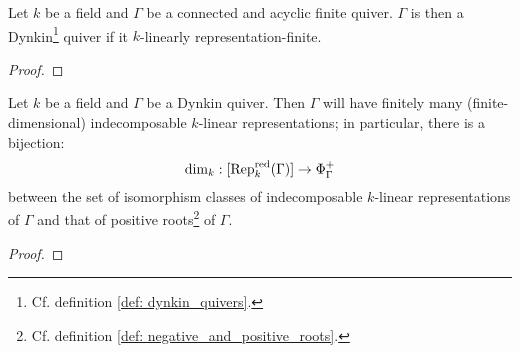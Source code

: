             \begin{theorem} \label{theorem: geometric_gabriel_theorem_representation_finite_implies_dynkin}
                Let $k$ be a field and $\Gamma$ be a connected and acyclic finite quiver. $\Gamma$ is then a Dynkin\footnote{Cf. definition \ref{def: dynkin_quivers}.} quiver if it $k$-linearly representation-finite.
            \end{theorem}
                \begin{proof}
                    
                \end{proof}
        
            \begin{theorem} \label{theorem: geometric_gabriel_theorem_dynkin_implies_representation_finite}
                Let $k$ be a field and $\Gamma$ be a Dynkin quiver. Then $\Gamma$ will have finitely many (finite-dimensional) indecomposable $k$-linear representations; in particular, there is a bijection:
                    $$\dim_k: [\mathrm{Rep}_k^{\mathrm{red}}(\Gamma)] \to \Phi_{\Gamma}^+$$
                between the set of isomorphism classes of indecomposable $k$-linear representations of $\Gamma$ and that of positive roots\footnote{Cf. definition \ref{def: negative_and_positive_roots}.} of $\Gamma$.
            \end{theorem}
                \begin{proof}
                    
                \end{proof}
                
            \begin{example}
                
            \end{example}
            \begin{example}
                
            \end{example}
            \begin{example}
                
            \end{example}
            \begin{example}
                
            \end{example}
            \begin{example}
                
            \end{example}
            
